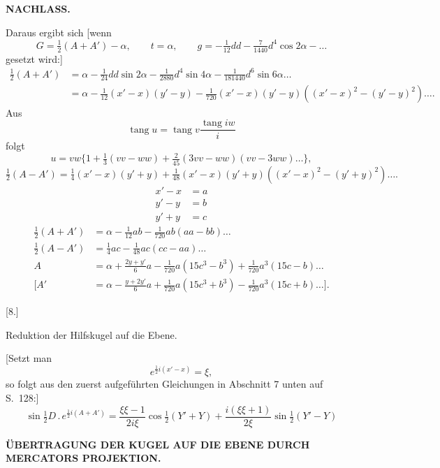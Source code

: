 \par\clearpage
\noindent{}\hfill{\small\textbf{NACHLASS.}}\hfill\null\par\medskip

Daraus ergibt sich [wenn
\[
G=\tfrac12(A+A')-\alpha,\qquad t=\alpha,\qquad
g=-\tfrac1{12}dd-\tfrac7{1440}d^4\cos2\alpha-\ldots
\]
\noindent gesetzt wird:]
\[
\begin{aligned}
\tfrac12(A+A')&=\alpha-\tfrac1{24}dd\sin2\alpha-\tfrac1{2880}d^4\sin4\alpha
 -\tfrac1{181440}d^6\sin6\alpha\ldots\\
 &=\alpha-\tfrac1{12}(x'-x)(y'-y)
 -\tfrac1{720}(x'-x)(y'-y)((x'-x)^2-(y'-y)^2)\ldots.
\end{aligned}
\]
Aus
\[
\operatorname{tang}u=\operatorname{tang}v\frac{\operatorname{tang}iw}{i}
\]
\noindent folgt
\[
u=vw\{1+\tfrac13(vv-ww)+\tfrac2{45}(3vv-ww)(vv-3ww)\ldots\},
\]
\noindent [somit ergibt sich für \(u=\tfrac12(A-A')\), \(v=\tfrac12(x'-x)\),
\(w=\tfrac12(y'+y)\):]
\[
\tfrac12(A-A')=\tfrac14(x'-x)(y'+y)
 +\tfrac1{48}(x'-x)(y'+y)((x'-x)^2-(y'+y)^2)\ldots.
\]
\noindent [Wird]
\[
\begin{aligned}
x'-x&=a\\
y'-y&=b\\
y'+y&=c
\end{aligned}
\]
\[
\begin{aligned}
\tfrac12(A+A')&=\alpha-\tfrac1{12}ab-\tfrac1{720}ab(aa-bb)\ldots\\
\tfrac12(A-A')&=\tfrac14ac-\tfrac1{48}ac(cc-aa)\ldots\\
A&=\alpha+\frac{2y+y'}6a-\tfrac1{720}a(15c^3-b^3)+\tfrac1{720}a^3(15c-b)\ldots\\
\mathopen{[}A'&=\alpha-\frac{y+2y'}6a+\tfrac1{720}a(15c^3+b^3)
 -\tfrac1{720}a^3(15c+b)\ldots\mathclose{]}.
\end{aligned}
\]

\begin{center}
[8.]\par\medskip
Reduktion der Hilfskugel auf die Ebene.
\end{center}
[Setzt man
\[
e^{\frac12i(x'-x)}=\xi,
\]
\noindent so folgt aus den zuerst aufgeführten Gleichungen in Abschnitt 7 unten auf S.\ 128:]
\[
\sin\tfrac12D\,.\,e^{\frac12i(A+A')}
 =\frac{\xi\xi-1}{2i\xi}\cos\tfrac12(Y'+Y)
 +\frac{i(\xi\xi+1)}{2\xi}\sin\tfrac12(Y'-Y)
\]

\par\clearpage
\noindent\null\hfill{\fontsize{8}{10}\selectfont\textbf{ÜBERTRAGUNG DER KUGEL AUF DIE EBENE DURCH MERCATORS PROJEKTION.}}\hfill{}\par\medskip

